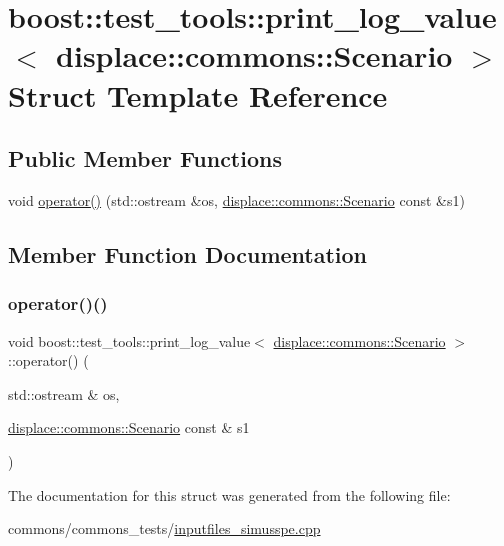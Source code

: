 \hypertarget{structboost_1_1test__tools_1_1print__log__value_3_01displace_1_1commons_1_1_scenario_01_4}{}\section{boost\+::test\+\_\+tools\+::print\+\_\+log\+\_\+value$<$ displace\+::commons\+::Scenario $>$ Struct Template Reference}
\label{structboost_1_1test__tools_1_1print__log__value_3_01displace_1_1commons_1_1_scenario_01_4}
\subsection*{Public Member Functions}
\begin{DoxyCompactItemize}
\item 
void \mbox{\hyperlink{structboost_1_1test__tools_1_1print__log__value_3_01displace_1_1commons_1_1_scenario_01_4_af5e1786097b74b9610d67750552789a1}{operator()}} (std\+::ostream \&os, \mbox{\hyperlink{structdisplace_1_1commons_1_1_scenario}{displace\+::commons\+::\+Scenario}} const \&s1)
\end{DoxyCompactItemize}


\subsection{Member Function Documentation}
\mbox{\label{structboost_1_1test__tools_1_1print__log__value_3_01displace_1_1commons_1_1_scenario_01_4_af5e1786097b74b9610d67750552789a1}} 
\subsubsection{\texorpdfstring{operator()()}{operator()()}}
{\footnotesize\ttfamily void boost\+::test\+\_\+tools\+::print\+\_\+log\+\_\+value$<$ \mbox{\hyperlink{structdisplace_1_1commons_1_1_scenario}{displace\+::commons\+::\+Scenario}} $>$\+::operator() (\begin{DoxyParamCaption}\item[{std\+::ostream \&}]{os,  }\item[{\mbox{\hyperlink{structdisplace_1_1commons_1_1_scenario}{displace\+::commons\+::\+Scenario}} const \&}]{s1 }\end{DoxyParamCaption})\hspace{0.3cm}{\ttfamily [inline]}}



The documentation for this struct was generated from the following file\+:\begin{DoxyCompactItemize}
\item 
commons/commons\+\_\+tests/\mbox{\hyperlink{inputfiles__simusspe_8cpp}{inputfiles\+\_\+simusspe.\+cpp}}\end{DoxyCompactItemize}
